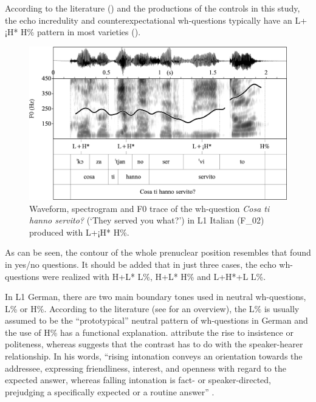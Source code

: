 According to the literature (\citealt[181]{GiliFivelaEtAl2015}) and the productions of the controls in this study, the echo incredulity and counterexpectational wh-questions typically have an L+¡H* H\% pattern in most varieties ().

\begin{figure}


\includegraphics[width=\textwidth]{figures/Figure_4.102.png}


\caption{Waveform, spectrogram and F0 trace of the wh-question \textit{Cosa ti hanno servito?} (‘They served you what?’) in L1 Italian (F\_02) produced with L+¡H* H\%.}
\label{fig:4.102}
\end{figure}

As can be seen, the contour of the whole prenuclear position resembles that found in yes/no questions. It should be added that in just three cases, the echo wh-questions were realized with H+L* L\%, H+L* H\% and L+H*+L L\%.


In L1 German, there are two main boundary tones used in neutral wh-ques\-tions, L\% or H\%. According to the literature (see \citealt{Klein1982, Kohler2005, PetroneNiebuhr2014} for an overview), the L\% is usually assumed to be the “prototypical” neutral pattern of wh-questions in German and the use of H\% has a functional explanation. \citet[12]{GriceBaumann2007} attribute the rise to insistence or politeness, whereas \citet{Kohler2005} suggests that the contrast has to do with the speaker-hearer relationship. In his words, “rising intonation conveys an orientation towards the addressee, expressing friendliness, interest, and openness with regard to the expected answer, whereas falling intonation is fact- or speaker-directed, prejudging a specifically expected or a routine answer” \citep[128]{Kohler2005}.



